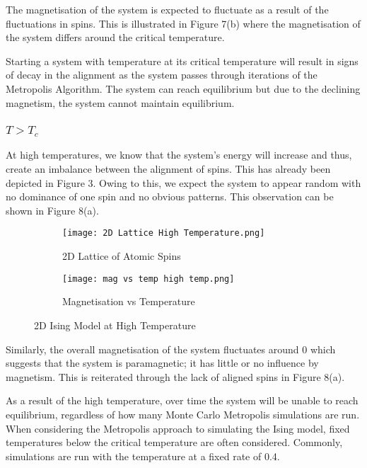 \documentclass[a4paper]{article}
\begin{document}
The magnetisation of the system is expected to fluctuate as a result of the fluctuations in spins. This is illustrated in Figure 7(b) where the magnetisation of the system differs around the critical temperature. 

Starting a system with temperature at its critical temperature will result in signs of decay in the alignment as the system passes through iterations of the Metropolis Algorithm. The system can reach equilibrium but due to the declining magnetism, the system cannot maintain equilibrium.

\subsubsection{$T > T_{c}$}

At high temperatures, we know that the system's energy will increase and thus, create an imbalance between the alignment of spins. This has already been depicted in Figure 3. Owing to this, we expect the system to appear random with no dominance of one spin and no obvious patterns. This observation can be shown in Figure 8(a). 

\begin{figure}[h]
\centering
\begin{subfigure}{0.37\textwidth}
\texttt{[image: 2D Lattice High Temperature.png]} 
\caption{2D Lattice of Atomic Spins}
\label{fig:subim1}
\end{subfigure}
\begin{subfigure}{0.5\textwidth}
\texttt{[image: mag vs temp high temp.png]}
\caption{Magnetisation vs Temperature}
\label{fig:subim2}
\end{subfigure}
\caption{2D Ising Model at High Temperature}
\label{fig:image2}
\end{figure}

Similarly, the overall magnetisation of the system fluctuates around 0 which suggests that the system is paramagnetic; it has little or no influence by magnetism. This is reiterated through the lack of aligned spins in Figure 8(a). 

As a result of the high temperature, over time the system will be unable to reach equilibrium, regardless of how many Monte Carlo Metropolis simulations are run. When considering the Metropolis approach to simulating the Ising model, fixed temperatures below the critical temperature are often considered. Commonly, simulations are run with the temperature at a fixed rate of 0.4. 
\end{document}
